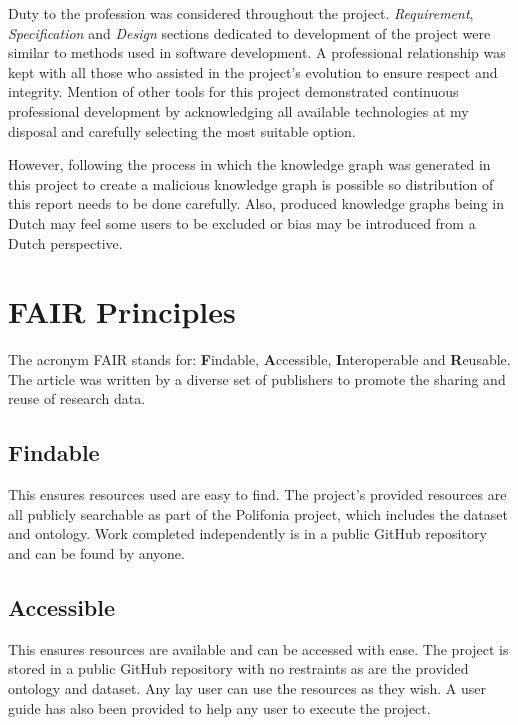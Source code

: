 Duty to the profession was considered throughout the project. \textit{Requirement}, \textit{Specification} and \textit{Design} sections dedicated to development of the project were similar to methods used in software development. A professional relationship was kept with all those who assisted in the project's evolution to ensure respect and integrity. Mention of other tools for this project demonstrated continuous professional development by acknowledging all available technologies at my disposal and carefully selecting the most suitable option. 

However, following the process in which the knowledge graph was generated in this project to create a malicious knowledge graph is possible so distribution of this report needs to be done carefully. Also, produced knowledge graphs being in Dutch may feel some users to be excluded or bias may be introduced from a Dutch perspective. 

\section{FAIR Principles}
\hspace{0.5cm} The acronym FAIR stands for: \textbf{F}indable, \textbf{A}ccessible, \textbf{I}nteroperable and \textbf{R}eusable. The article \cite{fairprinciples} was written by a diverse set of publishers to promote the sharing and reuse of research data. 

\subsection{Findable}
\hspace{0.5cm} This ensures resources used are easy to find. The project's provided resources are all publicly searchable as part of the Polifonia project, which includes the dataset and ontology. Work completed independently is in a public GitHub repository and can be found by anyone. 

\subsection{Accessible}
\hspace{0.5cm} This ensures resources are available and can be accessed with ease. The project is stored in a public GitHub repository with no restraints as are the provided ontology and dataset. Any lay user can use the resources as they wish. A user guide has also been provided to help any user to execute the project. 

